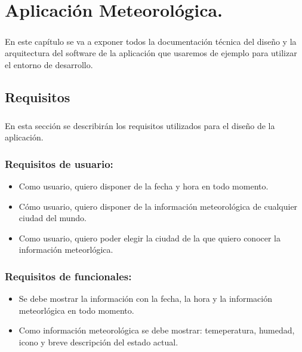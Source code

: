 \chapter{Aplicación Meteorológica.}\label{sec:AplicacionMeteorologica}

\paragraph{}En este capítulo se va a exponer todos la documentación técnica del diseño
y la arquitectura del software de la aplicación que usaremos de ejemplo para utilizar
el entorno de desarrollo.

\section{Requisitos}

\paragraph{}En esta sección se describirán los requisitos utilizados para el diseño
de la aplicación.

\subsection{Requisitos de usuario:}
\begin{itemize}
    \item Como usuario, quiero disponer de la fecha y hora en todo momento.
    \item Cómo usuario, quiero disponer de la información meteorológica de cualquier
    ciudad del mundo.
    \item Como usuario, quiero poder elegir la ciudad de la que quiero conocer la
    información meteorlógica.
\end{itemize}

\subsection{Requisitos de funcionales:}
\begin{itemize}
    \item Se debe mostrar la información con la fecha, la hora y la información meteorlógica
    en todo momento.
    \item Como información meteorológica se debe mostrar: temeperatura, humedad, icono
    y breve descripción del estado actual.
\end{itemize}

